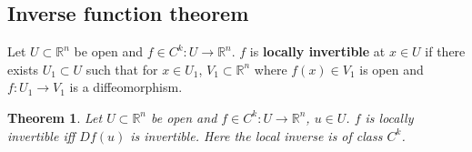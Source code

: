\documentclass[letter-paper]{tufte-book}
\newtheorem{theorem}{\color{pastel-blue}Theorem}[section]
\begin{document}

\subsection{Inverse function theorem}

Let $U \subset \mathbb{R}^n$ be open and $f \in C^k : U \to \mathbb{R}^n$. $f$
is \textbf{locally invertible} at $x \in U$ if there exists $U_1 \subset U$ such
that for $x \in U_1$, $V_1 \subset \mathbb{R}^n$ where $f(x) \in V_1$ is open
and $f: U_1 \to V_1$ is a diffeomorphism.

\begin{theorem}
  Let $U \subset \mathbb{R}^n$ be open and $f \in C^k : U \to \mathbb{R}^n$, $u
  \in U$. $f$ is locally invertible iff $Df(u)$ is invertible. Here the local
  inverse is of class $C^k$.
\end{theorem}
\end{document}
